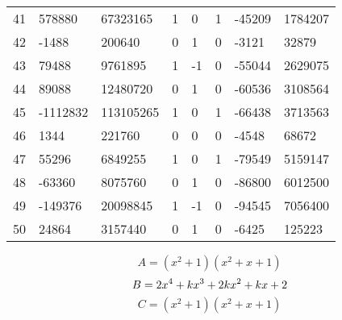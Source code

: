 \documentclass{amsart}
\begin{document}
\begin{longtable}{|l|l|l|lllll|}
41&578880&67323165&1&0&1&-45209&1784207\\
42&-1488&200640&0&1&0&-3121&32879\\
43&79488&9761895&1&-1&0&-55044&2629075\\
44&89088&12480720&0&1&0&-60536&3108564\\
45&-1112832&113105265&1&0&1&-66438&3713563\\
46&1344&221760&0&0&0&-4548&68672\\
47&55296&6849255&1&0&1&-79549&5159147\\
48&-63360&8075760&0&1&0&-86800&6012500\\
49&-149376&20098845&1&-1&0&-94545&7056400\\
50&24864&3157440&0&1&0&-6425&125223\\
\hline
\end{longtable}
$$A=(x^2
 + 1)(x^2
 + x
 + 1)$$
$$B=2\*x^4
 + k\*x^3
 + 2\*k\*x^2
 + k\*x
 + 2$$
$$C=(x^2
 + 1)(x^2
 + x
 + 1)$$
\end{document}
